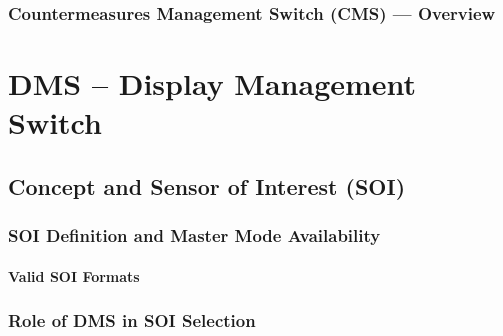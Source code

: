 \documentclass[11pt, a4paper, twoside]{report}
\begin{document}
\subsection{Countermeasures Management Switch (CMS) — Overview}
\label{sec:C2-S3-S3}

\newpage

\chapter{DMS -- Display Management Switch}
\label{chap:C3}

\section{Concept and Sensor of Interest (SOI)}
\label{sec:C3-S1}

\subsection{SOI Definition and Master Mode Availability}
\label{sec:C3-S1-S1}

\subsubsection{Valid SOI Formats}
\label{sec:C3-S1-S1-S1}

\subsection{Role of DMS in SOI Selection}
\label{sec:C3-S1-S2}
\end{document}
